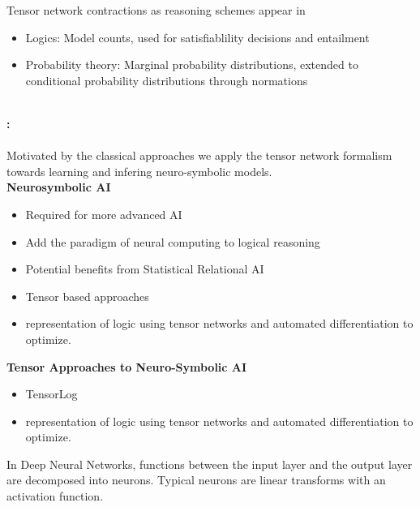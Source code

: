 Tensor network contractions as reasoning schemes appear in
\begin{itemize}
    \item Logics: Model counts, used for satisfiablility decisions and entailment
    \item Probability theory: Marginal probability distributions, extended to conditional probability distributions through normations
\end{itemize}

\ \\
\textbf{: \parttwotext} \\
\ \\
Motivated by the classical approaches we apply the tensor network formalism towards learning and infering neuro-symbolic models. \\

\textbf{Neurosymbolic AI}
\begin{itemize}
    \item Required for more advanced AI \cite{hochreiter_toward_2022}
    \item Add the paradigm of neural computing to logical reasoning
    \item Potential benefits from Statistical Relational AI \cite{marra_statistical_2024}
    \item Tensor based approaches \cite{cohen_tensorlog_2020}
    \item \cite{badreddine_logic_2022} representation of logic using tensor networks and automated differentiation to optimize.
\end{itemize}


\textbf{Tensor Approaches to Neuro-Symbolic AI}
\begin{itemize}
    \item TensorLog \cite{cohen_tensorlog_2020}
    \item \cite{badreddine_logic_2022} representation of logic using tensor networks and automated differentiation to optimize.
\end{itemize}

In Deep Neural Networks, functions between the input layer and the output layer are decomposed into neurons.
Typical neurons are linear transforms with an activation function.

